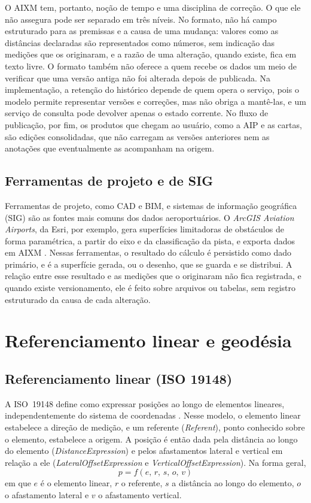 O AIXM tem, portanto, noção de tempo e uma disciplina de correção. O que ele não assegura pode ser separado em três níveis. No formato, não há campo estruturado para as premissas e a causa de uma mudança: valores como as distâncias declaradas são representados como números, sem indicação das medições que os originaram, e a razão de uma alteração, quando existe, fica em texto livre. O formato também não oferece a quem recebe os dados um meio de verificar que uma versão antiga não foi alterada depois de publicada. Na implementação, a retenção do histórico depende de quem opera o serviço, pois o modelo permite representar versões e correções, mas não obriga a mantê-las, e um serviço de consulta pode devolver apenas o estado corrente. No fluxo de publicação, por fim, os produtos que chegam ao usuário, como a AIP e as cartas, são edições consolidadas, que não carregam as versões anteriores nem as anotações que eventualmente as acompanham na origem.

\subsection{Ferramentas de projeto e de SIG}\label{sec:sig}

Ferramentas de projeto, como CAD e BIM, e sistemas de informação geográfica (SIG) são as fontes mais comuns dos dados aeroportuários. O \textit{ArcGIS Aviation Airports}, da Esri, por exemplo, gera superfícies limitadoras de obstáculos de forma paramétrica, a partir do eixo e da classificação da pista, e exporta dados em AIXM \cite{esri2024}. Nessas ferramentas, o resultado do cálculo é persistido como dado primário, e é a superfície gerada, ou o desenho, que se guarda e se distribui. A relação entre esse resultado e as medições que o originaram não fica registrada, e quando existe versionamento, ele é feito sobre arquivos ou tabelas, sem registro estruturado da causa de cada alteração.

\section{Referenciamento linear e geodésia}\label{sec:geo}

\subsection{Referenciamento linear (ISO 19148)}\label{sec:iso19148}

A ISO~19148 define como expressar posições ao longo de elementos lineares, independentemente do sistema de coordenadas \cite{iso19148}. Nesse modelo, o elemento linear estabelece a direção de medição, e um referente (\textit{Referent}), ponto conhecido sobre o elemento, estabelece a origem. A posição é então dada pela distância ao longo do elemento (\textit{DistanceExpression}) e pelos afastamentos lateral e vertical em relação a ele (\textit{LateralOffsetExpression} e \textit{VerticalOffsetExpression}). Na forma geral,
\begin{equation}
    p = f(e,\, r,\, s,\, o,\, v)
    \label{eq:lrs}
\end{equation}
em que $e$ é o elemento linear, $r$ o referente, $s$ a distância ao longo do elemento, $o$ o afastamento lateral e $v$ o afastamento vertical.


